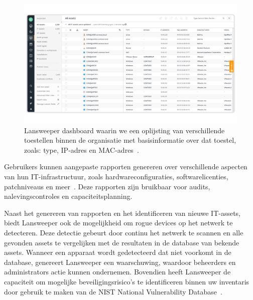 \begin{figure}[h!]
    \includegraphics[width=\textwidth]
    {./graphics/state-of-the-art/lansweeper-dashboard.png}
    \caption{\label{fig:lansweeper-dashboard}Lansweeper dashboard waarin we een oplijsting van verschillende toestellen binnen de organisatie met basisinformatie over dat toestel, zoals: type, IP-adres en MAC-adres~\autocite{lansweeper-dashboard}.}
\end{figure}

Gebruikers kunnen aangepaste rapporten genereren over verschillende aspecten van hun IT-infrastructuur, zoals hardwareconfiguraties, softwarelicenties, patchniveaus en meer~\autocite{lansweeper-features}.
Deze rapporten zijn bruikbaar voor audits, nalevingscontroles en capaciteitsplanning.

Naast het genereren van rapporten en het identificeren van nieuwe IT-assets, biedt Lansweeper ook de mogelijkheid om rogue devices op het netwerk te detecteren.
Deze detectie gebeurt door continu het netwerk te scannen en alle gevonden assets te vergelijken met de resultaten in de database van bekende assets.
Wanneer een apparaat wordt gedetecteerd dat niet voorkomt in de database, genereert Lansweeper een waarschuwing, waardoor beheerders en administrators actie kunnen ondernemen.
Bovendien heeft Lansweeper de capaciteit om mogelijke beveiligingsrisico's te identificeren binnen uw inventaris door gebruik te maken van de NIST National Vulnerability Database~\autocite{lansweeper-cam}.
